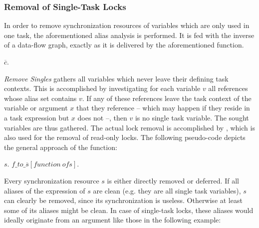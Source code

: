 \subsubsection{Removal of Single-Task Locks}
\label{single-task-locks}
In order to remove synchronization resources of variables which are only used in one task, the aforementioned alias analysis is performed. It is fed with the inverse of a data-flow graph, exactly as it is delivered by the aforementioned function. 
\begin{algorithmic}
 
    \State $\overline{c}$. 
  \EndIf
\EndFor
\State {}
\EndFunction
\end{algorithmic}
\textit{Remove Singles} gathers all variables which never leave their defining task contexts. This is accomplished by investigating for each variable $v$ all references whose alias set contains $v$. If any of these references leave the task context of the variable or argument $x$ that they reference -- which may happen if they reside in a task expression but $x$ does not --, then $v$ is no single task variable. The sought variables are thus gathered. The actual lock removal is accomplished by , which is also used for the removal of read-only locks. The following pseudo-code depicts the general approach of the function:
\begin{algorithmic}
 
   
    \State $s$.
  \Else
    \State $\mathit{f\_to\_\overline{s}}[\mathit{function\ of }s]$. 
  \EndIf
\EndFor

  \State {}
\EndFor

\EndFunction
\end{algorithmic}
Every synchronization resource $s$ is either directly removed or deferred. If all aliases of the expression of $s$ are clean (e.g. they are all single task variables), $s$ can clearly be removed, since its synchronization is useless. Otherwise at least some of its aliases might be clean. In case of single-task locks, these aliases would ideally originate from an argument like those in the following example:
